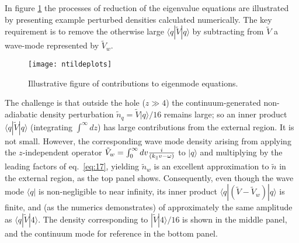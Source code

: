 \documentclass[12pt]{article}
\def\ket#1{|#1\rangle}
\def\bra#1{\langle#1}
\begin{document}
In figure \ref{ntildeplots} the processes of reduction of the
eigenvalue equations are illustrated by presenting example perturbed
densities calculated numerically. The key requirement is to remove the
otherwise large $\bra{q}|\tilde V\ket{q}$ by subtracting from
$\tilde V$ a wave-mode represented by $\tilde V_w$.
\begin{figure}[htp]
\center  \texttt{[image: ntildeplots]}
  \caption{Illustrative figure of contributions to eigenmode
    equations. \label{ntildeplots}}
\end{figure}
The challenge is that outside the hole ($z\gg 4$) the
continuum-generated non-adiabatic density perturbation
$\tilde n_q=\tilde V\ket{q}/16$ remains large; so an inner product
$\bra{q}|\tilde V\ket{q}$ (integrating $\int^\infty dz$) has large
contributions from the external region. It is not small. However, the
corresponding wave mode density arising from applying the
$z$-independent operator
$\tilde V_w=\int_0^\infty dv {i\over(k_\parallel v-\omega)}$ to
$\ket{q}$ and multiplying by the leading factors of eq.\ \ref{eq:17},
yielding $\tilde n_w$ is an excellent approximation to $\tilde n$ in
the external region, as the top panel shows. Consequently, even though
the wave mode $\bra{q}|$ is non-negligible to near infinity, its
inner product $\bra{q}|(\tilde{V}-\tilde{V}_{w})\ket{q}$ is finite,
and (as the numerics demonstrates) of approximately the same amplitude
as $\bra{q}|\tilde V\ket{4}$. The density corresponding to
$|\tilde V\ket{4}/16$ is shown in the middle panel, and the continuum
mode for reference in the bottom panel.

\iffalse
The continuum mode equation is

\begin{equation}
  \label{eq:19}
  0= (\lambda_q-\lambda_\perp)w_q+\bra{q}|\tilde{V}\ket{4}w_4
  +\tilde{V}_{w}w_q
  +\bra{q}|(\tilde{V}-\tilde{V}_{w})\ket{q}\int w_pdp.  
\end{equation}
He is not persuaded that my argument demonstrates that the last term
is negligible. He says that numerically
$\bra{q}|(\tilde{V}-\tilde{V}_{w})\ket{q} \sim 20
\bra{q}|\tilde{V}\ket{4}$ (I presume for normalized modes), and that
therefore $\int w_pdp\ll w_4$ is not sufficient criterion.

Clarifying my argument, I claim that
$\bra{q}|\tilde V \ket{4}\sim 16\omega$ and that, if $\int w_q$ is
determined ignoring the final term, then
$\int w _q dq/w_4 ={-i\pi\bra{q}|\tilde{V}\ket{4}\over
  q_0(1/\omega_r^2-1)} \sim{-i\pi\bra{q}|\tilde{V}\ket{4}\over
  4k_\perp/\omega_r} \sim 4\pi\omega\omega_r/k_\perp\sim 4\pi \omega$.
This is of order the small quantity $\omega$.

If it is true that $\bra{q}|(\tilde{V}-\tilde{V}_{w})\ket{q} \sim 20
\bra{q}|\tilde{V}\ket{4}$, then for the final term to be
negligible, we need $20\int w_pdp\ll w_4$, which is
$$
\int w_pdp/ w_4 \sim 4\pi\omega \ll 1/20
\quad i.e. \quad \omega\ll \sim 1/(80\pi).
$$
Admittedly that is a very small frequency! Thus the factor of 20, if
true, is a significant problem, and we ought to verify it.
\fi
\end{document}
